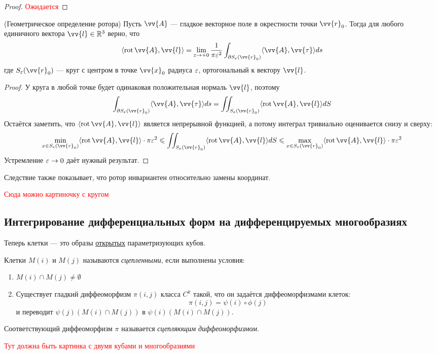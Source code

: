\begin{proof}
	\textcolor{red}{Ожидается}
\end{proof}

\begin{corollary} (Геометрическое определение ротора)
	Пусть $\vv{A}$ --- гладкое векторное поле в окрестности точки $\vv{r}_0$. Тогда для любого единичного вектора $\vv{l} \in \R^3$ верно, что
	\[
		\ntbr{\rot \vv{A}, \vv{l}} = \lim_{\eps \to +0} \frac{1}{\pi \eps^2} \int_{\vdelta S_\eps(\vv{r}_0)} \ntbr{\vv{A}, \vv{\tau}}ds
	\]
	где $S_\eps(\vv{r}_0)$ --- круг с центром в точке $\vv{x}_0$ радиуса $\varepsilon$, ортогональный к вектору $\vv{l}$.
\end{corollary}

\begin{proof}
	У круга в любой точке будет одинаковая положительная нормаль $\vv{l}$, поэтому
	\[
		\int_{\vdelta S_\eps(\vv{r}_0)} \ntbr{\vv{A}, \vv{\tau}}ds = \iint_{S_\eps(\vv{r}_0)} \ntbr{\rot \vv{A}, \vv{l}}dS
	\]
	Остаётся заметить, что $\ntbr{\rot \vv{A}, \vv{l}}$ является непрерывной функцией, а потому интеграл тривиально оценивается снизу и сверху:
	\[
		\min_{x \in S_\eps(\vv{r}_0)} \ntbr{\rot \vv{A}, \vv{l}} \cdot \pi\eps^2 \le \iint_{S_\eps(\vv{r}_0)} \ntbr{\rot \vv{A}, \vv{l}}dS \le \max_{x \in S_\eps(\vv{r}_0)} \ntbr{\rot \vv{A}, \vv{l}} \cdot \pi\eps^2
	\]
	Устремление $\varepsilon \to 0$ даёт нужный результат.
\end{proof}

\begin{note}
	Следствие также показывает, что ротор инвариантен относительно замены координат.
\end{note}

\textcolor{red}{Сюда можно картиночку с кругом}

\subsection{Интегрирование дифференциальных форм на дифференцируемых многообразиях}

\begin{note}
	Теперь клетки --- это образы \underline{открытых} параметризующих кубов.
\end{note}

\begin{definition}
	Клетки $M(i)$ и $M(j)$ называются \textit{сцепленными}, если выполнены условия:
	\begin{enumerate}
		\item $M(i) \cap M(j) \neq \emptyset$
		
		\item Существует гладкий диффеоморфизм $\pi(i, j)$ класса $C^k$ такой, что он задаётся диффеоморфизмами клеток:
		\[
			\pi(i, j) = \psi(i) \circ \phi(j)
		\]
		и переводит $\psi(j)(M(i) \cap M(j))$ в $\psi(i)(M(i) \cap M(j))$.
	\end{enumerate}
	Соответствующий диффеоморфизм $\pi$ называется \textit{сцепляющим диффеоморфизмом}.
\end{definition}

\textcolor{red}{Тут должна быть картинка с двумя кубами и многообразиями}
